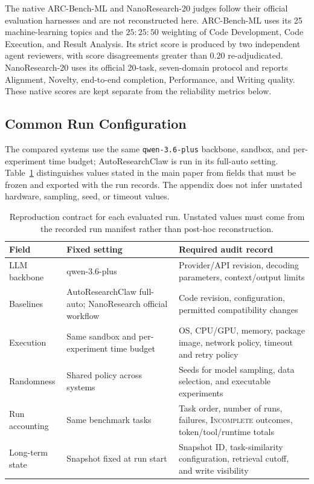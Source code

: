 The native ARC-Bench-ML and NanoResearch-20 judges follow their official
evaluation harnesses and are not reconstructed here. ARC-Bench-ML uses its 25
machine-learning topics and the $25{:}25{:}50$ weighting of Code Development,
Code Execution, and Result Analysis. Its strict score is produced by two
independent agent reviewers, with score disagreements greater than $0.20$
re-adjudicated. NanoResearch-20 uses its official 20-task, seven-domain protocol
and reports Alignment, Novelty, end-to-end completion, Performance, and Writing
quality. These native scores are kept separate from the reliability metrics
below.

\subsection{Common Run Configuration}

The compared systems use the same \texttt{qwen-3.6-plus} backbone, sandbox, and
per-experiment time budget; AutoResearchClaw is run in its full-auto setting.
Table~\ref{tab:reproduction-contract} distinguishes values stated in the main
paper from fields that must be frozen and exported with the run records. The
appendix does not infer unstated hardware, sampling, seed, or timeout values.

\begin{table}[t]
  \centering
  \small
  \setlength{\tabcolsep}{3pt}
  \begin{tabular}{@{}p{2.70cm}p{5.00cm}p{8.30cm}@{}}
    \toprule
    \textbf{Field} & \textbf{Fixed setting} & \textbf{Required audit record} \\
    \midrule
    LLM backbone & qwen-3.6-plus & Provider/API revision, decoding
    parameters, context/output limits \\
    Baselines & AutoResearch\hspace{0pt}Claw full-auto; NanoResearch official workflow &
    Code revision, configuration, permitted compatibility changes \\
    Execution & Same sandbox and per-experiment time budget & OS, CPU/GPU,
    memory, package image, network policy, timeout and retry policy \\
    Randomness & Shared policy across systems & Seeds for model sampling, data
    selection, and executable experiments \\
    Run accounting & Same benchmark tasks & Task order, number of runs,
    failures, \textsc{Incomplete} outcomes, token/tool/runtime totals \\
    Long-term state & Snapshot fixed at run start & Snapshot ID, task-similarity
    configuration, retrieval cutoff, and write visibility \\
    \bottomrule
  \end{tabular}
  \caption{Reproduction contract for each evaluated run. Unstated values must
  come from the recorded run manifest rather than post-hoc reconstruction.}
  \label{tab:reproduction-contract}
\end{table}

